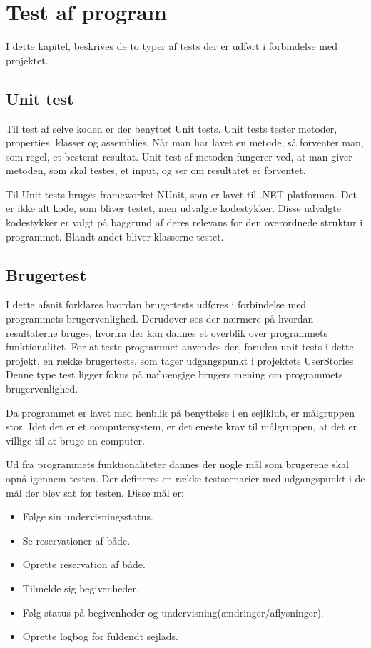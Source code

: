 \chapter{Test af program}
I dette kapitel, beskrives de to typer af tests der er udført i forbindelse med projektet.

\section{Unit test}
Til test af selve koden er der benyttet Unit tests.
Unit tests tester metoder, properties, klasser og assemblies. 
Når man har lavet en metode, så forventer man, som regel, et bestemt resultat.
Unit test af metoden fungerer ved, at man giver metoden, som skal testes, et input, og ser om resultatet er forventet. 

Til Unit tests bruges frameworket NUnit, som er lavet til .NET platformen. 
Det er ikke alt kode, som bliver testet, men udvalgte kodestykker.
Disse udvalgte kodestykker er valgt på baggrund af deres relevans for den overordnede struktur i programmet. 
Blandt andet bliver klasserne testet.

\section{Brugertest}
I dette afsnit forklares hvordan brugertests udføres i forbindelse med programmets brugervenlighed.
Derudover ses der nærmere på hvordan resultaterne bruges, hvorfra der kan dannes et overblik over programmets funktionalitet. 
For at teste programmet anvendes der, foruden unit tests i dette projekt, en række brugertests, som tager udgangspunkt i projektets UserStories
Denne type test ligger fokus på uafhængige brugers mening om programmets brugervenlighed.

Da programmet er lavet med henblik på benyttelse i en sejlklub, er målgruppen stor. 
Idet det er et computersystem, er det eneste krav til målgruppen, at det er villige til at bruge en computer.

Ud fra programmets funktionaliteter dannes der nogle mål som brugerene skal opnå igennem testen. 
Der defineres en række testscenarier med udgangspunkt i de mål der blev sat for testen.
Disse mål er:
\begin{itemize}
  \item Følge sin undervisningsstatus.
  \item Se reservationer af både.
  \item Oprette reservation af både.
  \item Tilmelde sig begivenheder.
  \item Følg status på begivenheder og undervisning(ændringer/aflysninger).
  \item Oprette logbog for fuldendt sejlads.
\end{itemize}

